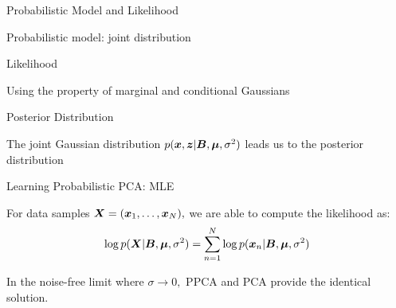 \documentclass[handout,fleqn,aspectratio=169]{beamer}
\begin{document}
\begin{frame}{Probabilistic Model and Likelihood}

\plitemsep 0.07in

\bci 
\item Probabilistic model: joint distribution

\item Likelihood
\bci
\item Using the property of marginal and conditional Gaussians \hfill {}
\eci
\eci
\end{frame}

\begin{frame}{Posterior Distribution}

\plitemsep 0.07in

\bci 
\item The joint Gaussian distribution $p(\bm{x},\bm{z} | \bm{B}, \bm{\mu}, \sigma^2)$ leads us to the posterior distribution

\eci
\end{frame}

\begin{frame}{Learning Probabilistic PCA: MLE}

\plitemsep 0.07in

\bci 
\item For data samples $\bm{X} = (\bm{x}_1, \ldots, \bm{x}_N),$ we are able to compute the likelihood as: 
$$
\log p(\bm{X} | \bm{B}, \bm{\mu}, \sigma^2 ) = \sum_{n=1}^N \log p(\bm{x}_n | \bm{B}, \bm{\mu}, \sigma^2)
$$

\item In the noise-free limit where $\sigma \rightarrow 0,$ PPCA and PCA provide the identical solution.
\eci
\end{frame}
\end{document}

